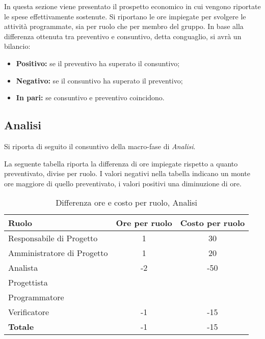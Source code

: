 In questa sezione viene presentato il prospetto economico in cui vengono riportate le spese effettivamente sostenute. Si riportano le ore impiegate per svolgere le attività programmate, sia per ruolo che per membro del gruppo. In base alla differenza ottenuta tra preventivo e consuntivo, detta conguaglio, si avrà un bilancio:
\begin{itemize}
	\item \textbf{Positivo:} se il preventivo ha superato il consuntivo; 
	\item \textbf{Negativo:} se il consuntivo ha superato il preventivo;
	\item \textbf{In pari:} se consuntivo e preventivo coincidono.
\end{itemize}

\subsection{Analisi}
Si riporta di seguito il consuntivo della macro-fase di \textit{Analisi}.

\noindent La seguente tabella riporta la differenza di ore impiegate rispetto a quanto preventivato, divise per ruolo. I valori negativi nella tabella indicano un monte ore maggiore di quello preventivato, i valori positivi una diminuzione di ore.

\begin{table}[h]
\centering
\begin{tabular}{|l|c|c|}
	\toprule
	\textbf{Ruolo} & \textbf{Ore per ruolo} & \textbf{Costo per ruolo} \\
	
	\midrule
	Responsabile di Progetto & 1 & 30 \\
	Amministratore di Progetto & 1 & 20 \\ 
	Analista & -2 & -50 \\
	Progettista & & \\
	Programmatore & & \\
	Verificatore & -1 & -15 \\
	\midrule
	\textbf{Totale} & -1 & -15 \\
		
	\bottomrule
\end{tabular}
\caption{Differenza ore e costo per ruolo, Analisi}
\label{tab3}
\end{table} 

